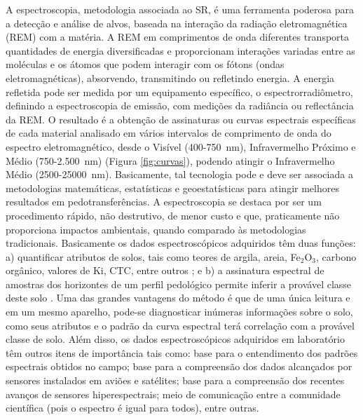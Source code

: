 A espectroscopia, metodologia associada ao SR, é uma ferramenta poderosa para a detecção e análise de alvos, baseada na interação da radiação eletromagnética (REM) com a matéria. A REM em comprimentos de onda diferentes transporta quantidades de energia diversificadas e proporcionam interações variadas entre as moléculas e os átomos que podem interagir com os fótons (ondas eletromagnéticas), absorvendo, transmitindo ou refletindo energia. A energia refletida pode ser medida por um equipamento específico, o espectrorradiômetro, definindo a espectroscopia de emissão, com medições da radiância ou reflectância da REM. O resultado é a obtenção de assinaturas ou curvas espectrais específicas de cada material analisado em vários intervalos de comprimento de onda do espectro eletromagnético, desde o Visível (400-750~nm), Infravermelho Próximo e Médio (750-2.500~nm) (Figura \ref{fig:curvas}), podendo atingir o Infravermelho Médio (2500-25000~nm). Basicamente, tal tecnologia pode e deve ser associada a metodologias matemáticas, estatísticas e geoestatísticas para atingir melhores resultados em pedotransferências. A espectroscopia se destaca por ser um procedimento rápido, não destrutivo, de menor custo e que, praticamente não proporciona impactos ambientais, quando comparado às metodologias tradicionais. Basicamente os dados espectroscópicos adquiridos têm duas funções: a) quantificar atributos de solos, tais como teores de argila, areia, Fe$_2$O$_3$, carbono orgânico, valores de Ki, CTC, entre outros \citep{Soriano-DislaEtAl:2014}; e b) a assinatura espectral de amostras dos horizontes de um perfil pedológico permite inferir a provável classe deste solo \citep{VasquesEtAl:2014}. Uma das grandes vantagens do método é que de uma única leitura e em um mesmo aparelho, pode-se diagnosticar inúmeras informações sobre o solo, como seus atributos e o padrão da curva espectral terá correlação com a provável classe de solo. Além disso, os dados espectroscópicos adquiridos em laboratório têm outros itens de importância tais como: base para o entendimento dos padrões espectrais obtidos no campo; base para a compreensão dos dados alcançados por sensores instalados em aviões e satélites; base para a compreensão dos recentes avanços de sensores hiperespectrais; meio de comunicação entre a comunidade científica (pois o espectro é igual para todos), entre outras.

